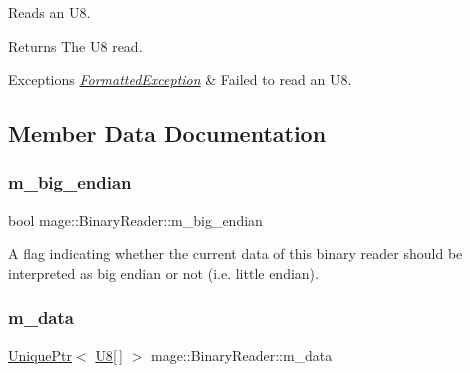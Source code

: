 Reads an {\ttfamily U8}.

\begin{DoxyReturn}{Returns}
The {\ttfamily U8} read. 
\end{DoxyReturn}

\begin{DoxyExceptions}{Exceptions}
{\em \hyperlink{structmage_1_1_formatted_exception}{Formatted\+Exception}} & Failed to read an {\ttfamily U8}. \\
\hline
\end{DoxyExceptions}


\subsection{Member Data Documentation}
\hypertarget{classmage_1_1_binary_reader_a8d23fde958e08efe248edb5d92861113}{}\label{classmage_1_1_binary_reader_a8d23fde958e08efe248edb5d92861113} 
\subsubsection{\texorpdfstring{m\+\_\+big\+\_\+endian}{m\_big\_endian}}
{\footnotesize\ttfamily bool mage\+::\+Binary\+Reader\+::m\+\_\+big\+\_\+endian\hspace{0.3cm}{\ttfamily [private]}}

A flag indicating whether the current data of this binary reader should be interpreted as big endian or not (i.\+e. little endian). \hypertarget{classmage_1_1_binary_reader_a529bdcb620e1250aa0b12716c9b7eae1}{}\label{classmage_1_1_binary_reader_a529bdcb620e1250aa0b12716c9b7eae1} 
\subsubsection{\texorpdfstring{m\+\_\+data}{m\_data}}
{\footnotesize\ttfamily \hyperlink{namespacemage_a3316d7143a973e37adf1110f2e80ca31}{Unique\+Ptr}$<$ \hyperlink{namespacemage_afc638980bc6154f15af5e2d93a0e0ea9}{U8}\mbox{[}$\,$\mbox{]} $>$ mage\+::\+Binary\+Reader\+::m\+\_\+data\hspace{0.3cm}{\ttfamily [private]}}

